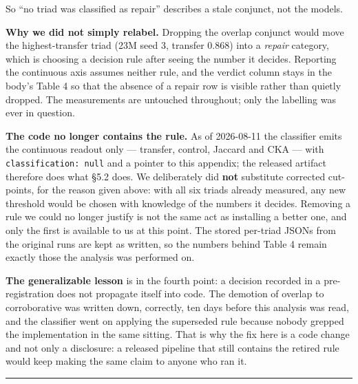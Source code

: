 \documentclass[11pt]{article}
\begin{document}
So ``no triad was classified as repair'' describes a stale conjunct, not the models.

\textbf{Why we did not simply relabel.} Dropping the overlap conjunct would move the
highest-transfer triad (23M seed 3, transfer 0.868) into a \emph{repair} category, which is
choosing a decision rule after seeing the number it decides. Reporting the continuous axis
assumes neither rule, and the verdict column stays in the body's Table 4 so that the absence
of a repair row is visible rather than quietly dropped. The measurements are untouched
throughout; only the labelling was ever in question.

\textbf{The code no longer contains the rule.} As of 2026-08-11 the classifier emits the
continuous readout only --- transfer, control, Jaccard and CKA --- with \texttt{classification:\ null}
and a pointer to this appendix; the released artifact therefore does what §5.2 does. We
deliberately did \textbf{not} substitute corrected cut-points, for the reason given above: with
all six triads already measured, any new threshold would be chosen with knowledge of the
numbers it decides. Removing a rule we could no longer justify is not the same act as
installing a better one, and only the first is available to us at this point. The stored
per-triad JSONs from the original runs are kept as written, so the numbers behind Table 4
remain exactly those the analysis was performed on.

\textbf{The generalizable lesson} is in the fourth point: a decision recorded in a
pre-registration does not propagate itself into code. The demotion of overlap to
corroborative was written down, correctly, ten days before this analysis was read, and the
classifier went on applying the superseded rule because nobody grepped the implementation in
the same sitting. That is why the fix here is a code change and not only a disclosure: a
released pipeline that still contains the retired rule would keep making the same claim to
anyone who ran it.

\begin{center}\rule{0.5\linewidth}{0.5pt}\end{center}
\end{document}
